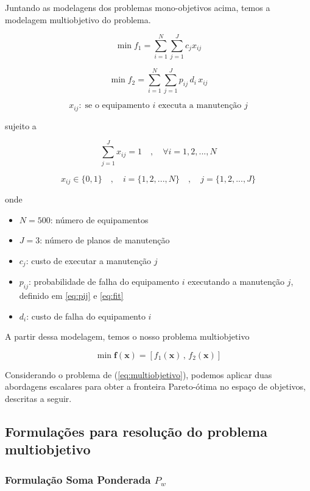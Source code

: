 \documentclass[conference]{IEEEtran}
\newcommand{\un}[1]{\;\text{#1}}
\begin{document}
Juntando as modelagens dos problemas mono-objetivos acima, temos 
a modelagem multiobjetivo do problema.

\[  \min f_1 = \sum_{i=1}^{N} \sum_{j=1}^{J} c_j x_{ij} \]

\[  \min f_2 = \sum_{i=1}^{N} \sum_{j=1}^{J} p_{ij} \, d_i \, x_{ij} \]

\[  x_{ij}: \un{se o equipamento $i$ executa a manutenção $j$}  \]


\noindent sujeito a

\[ \sum_{j=1}^{J} x_{ij} = 1 \quad , \quad \forall i = {1, 2, ..., N} \]

\[ x_{ij} \in \{0,1\} \quad , \quad i = \{1, 2, ..., N\}  \quad , \quad j = \{1, 2, ..., J\} \]

\noindent onde

\begin{itemize}
	\item $N = 500$: número de equipamentos
	\item $J = 3$: número de planos de manutenção
	\item $c_j$: custo de executar a manutenção $j$
	\item $p_{ij}$: probabilidade de falha do equipamento $i$ executando a manutenção $j$, definido em \ref{eq:pij} e \ref{eq:fit}
	\item $d_{i}$: custo de falha do equipamento $i$
\end{itemize}

A partir dessa modelagem, temos o nosso problema multiobjetivo 

\begin{equation} \label{eq:multiobjetivo}
	\min \mathbf{f}\left( \mathbf{x} \right) = \left[ f_1\left( \mathbf{x} \right) \, , \, f_2\left( \mathbf{x} \right) \right]
\end{equation}

Considerando o problema de (\ref{eq:multiobjetivo}), podemos aplicar duas abordagens escalares 
para obter a fronteira Pareto-ótima no espaço de objetivos, descritas a seguir.

\subsection{Formulações para resolução do problema multiobjetivo}

\subsubsection{Formulação Soma Ponderada $P_{w}$}
\end{document}

